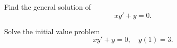 \setcounter{example}{3}
\setcounter{equation}{7}
\begin{example}
  \label{example:2.1.4}\rm

  \begin{alist}
    \item %
    Find the general solution of
    \begin{equation}
      xy'+y=0.\label{eq:2.1.8}
    \end{equation}

    \item %
    Solve the initial value problem
    \begin{equation}
      xy'+y=0,\quad y(1)=3.\label{eq:2.1.9}
    \end{equation}
  \end{alist}
\end{example}
\setcounter{equation}{9}
\setcounter{figure}{1}
